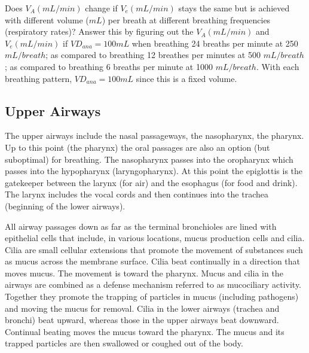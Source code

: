Does $V_A (mL/min)$ change if $V_e (mL/min)$ stays the same but is achieved with different volume ($mL$) per breath at different breathing frequencies (respiratory rates)? Answer this by figuring out the $V_A (mL/min)$ and $V_e (mL/min)$ if $VD_{ana} = 100 mL$ when breathing 24 breaths per minute at 250 $mL/breath$; as compared to breathing 12 breathes per minutes at 500 $mL/breath$; as compared to breathing 6 breaths per minute at 1000 $mL/breath$. With each breathing pattern, $VD_{ana} = 100 mL$ since this is a fixed volume.

\subsection{Upper Airways}

The upper airways include the nasal passageways, the nasopharynx, the pharynx. Up to this point (the pharynx) the oral passages are also an option (but suboptimal) for breathing. The nasopharynx passes into the oropharynx which passes into the hypopharynx (laryngopharynx). At this point the epiglottis is the gatekeeper between the larynx (for air) and the esophagus (for food and drink).  The larynx includes the vocal cords and then continues into the trachea (beginning of the lower airways). 

All airway passages down as far as the terminal bronchioles are lined with epithelial cells that include, in various locations, mucus production cells and cilia. Cilia are small cellular extensions that promote the movement of substances such as mucus across the membrane surface. Cilia beat continually in a direction that moves mucus. The movement is toward the pharynx. Mucus and cilia in the airways are combined as a defense mechanism referred to as mucociliary activity. Together they promote the trapping of particles in mucus (including pathogens) and moving the mucus for removal. Cilia in the lower airways (trachea and bronchi) beat upward, whereas those in the upper airways beat downward. Continual beating moves the mucus toward the pharynx. The mucus and its trapped particles are then swallowed or coughed out of the body.

